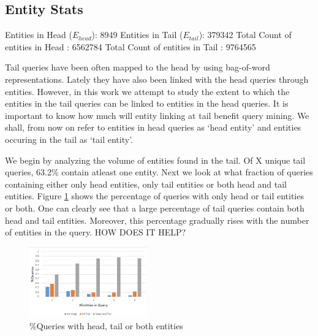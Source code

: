 \subsection{Entity Stats}
Entities in Head ($E_{head}$): 8949
Entities in Tail ($E_{tail}$): 379342
Total Count of entities in Head : 6562784
Total Count of entities in Tail : 9764565

Tail queries have been often mapped to the head \cite{} by using bag-of-word representations.
Lately they have also been linked with the head queries through entities. However, in this work
we attempt to study the extent to which the entities in the tail queries can be linked to entities 
in the head queries. It is important to know how much will entity linking at tail benefit query mining. 
We shall, from now on refer to entities in head queries as `head entity' 
and entities occuring in the tail as `tail entity'. 


We begin by analyzing the volume of entities found in the tail. Of X unique tail queries,
63.2\% contain atleast one entity. 
Next we look at what fraction of queries containing either only head entities, only tail entities 
or both head and tail entities. Figure \ref{img:headTailEntPercent} shows the percentage of 
queries with only head or tail entities or both. One can clearly see that a large percentage of tail 
queries contain both head and tail entities. Moreover, this percentage gradually rises with the 
number of entities in the query. HOW DOES IT HELP?

\begin{figure}[t]
\label{img:headTailEntPercent}
\caption{\%Queries with head, tail or both entities}
  \centering
    \includegraphics[width = 0.45\textwidth]{images/entity-head-tail-count.png}
\end{figure}
 
